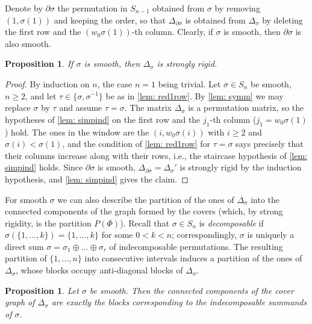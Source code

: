 \documentclass[12pt]{article}
\newtheorem{proposition}[theorem]{Proposition}
\newcommand{\IM}{\Delta}
\begin{document}
Denote by $\partial\sigma$ the permutation in $S_{n-1}$ obtained from $\sigma$ by removing $(1,\sigma(1))$ and keeping the order,
so that $\IM_{\partial\sigma}$ is obtained from $\IM_\sigma$ by deleting the first row and the $(w_0\sigma(1))$-th column.
Clearly, if $\sigma$ is smooth, then $\partial\sigma$ is also smooth.

\begin{proposition} \label{prop: smoothstrong}
If $\sigma$ is smooth, then $\IM_\sigma$ is strongly rigid.
\end{proposition}

\begin{proof}
By induction on $n$, the case $n=1$ being trivial. Let $\sigma\in S_n$ be smooth, $n\ge2$, and let $\tau\in\{\sigma,\sigma^{-1}\}$
be as in \cref{lem: red1row}. By \cref{lem: symm} we may replace $\sigma$ by $\tau$ and assume $\tau=\sigma$.
The matrix $\IM_\sigma$ is a permutation matrix, so the hypotheses of \cref{lem: simpind} on the first row
and the $j_1$-th column ($j_1=w_0\sigma(1)$) hold. The ones in the window are the $(i,w_0\sigma(i))$ with $i\ge2$ and
$\sigma(i)<\sigma(1)$, and the condition of \cref{lem: red1row} for $\tau=\sigma$ says precisely that their columns
increase along with their rows, i.e., the staircase hypothesis of \cref{lem: simpind} holds.
Since $\partial\sigma$ is smooth, $\IM_{\partial\sigma}=\IM_\sigma'$ is strongly rigid by the induction hypothesis,
and \cref{lem: simpind} gives the claim.
\end{proof}

For smooth $\sigma$ we can also describe the partition of the ones of $\IM_\sigma$ into the connected components
of the graph formed by the covers (which, by strong rigidity, is the partition $P(\Phi)$).
Recall that $\sigma\in S_n$ is \emph{decomposable} if $\sigma(\{1,\dots,k\})=\{1,\dots,k\}$ for some $0<k<n$;
correspondingly, $\sigma$ is uniquely a direct sum $\sigma=\sigma_1\oplus\dots\oplus\sigma_r$ of indecomposable
permutations. The resulting partition of $\{1,\dots,n\}$ into consecutive intervals induces a partition of the ones
of $\IM_\sigma$, whose blocks occupy anti-diagonal blocks of $\IM_\sigma$.

\begin{proposition} \label{prop: covcomp}
Let $\sigma$ be smooth. Then the connected components of the cover graph of $\IM_\sigma$ are exactly the blocks
corresponding to the indecomposable summands of $\sigma$.
\end{proposition}
\end{document}
